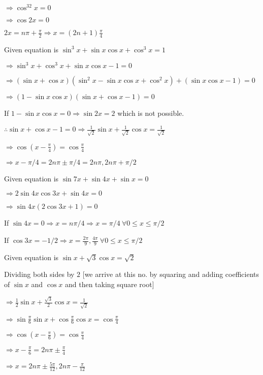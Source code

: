   $\Rightarrow \cos^32x = 0$

  $\Rightarrow \cos 2x = 0$

  $2x = n\pi + \frac{\pi}{2} \Rightarrow x = (2n + 1)\frac{\pi}{4}$

\item Given equation is $\sin^3x + \sin x\cos x + \cos^3x = 1$

  $\Rightarrow \sin^3x + \cos^3x + \sin x\cos x - 1 = 0$

  $\Rightarrow (\sin x + \cos x)(\sin^2x - \sin x\cos x + \cos^2x) + (\sin x\cos x - 1) = 0$

  $\Rightarrow (1 - \sin x\cos x)(\sin x + \cos x - 1) = 0$

  If $1 - \sin x\cos x = 0 \Rightarrow \sin 2x = 2$ which is not possible.

  $\therefore \sin x + \cos x - 1 = 0 \Rightarrow \frac{1}{\sqrt{2}}\sin x + \frac{1}{\sqrt{2}}\cos x = \frac{1}{\sqrt{2}}$

  $\Rightarrow \cos\left(x - \frac{\pi}{4}\right) = \cos\frac{\pi}{4}$

  $\Rightarrow x - \pi/4 = 2n\pi \pm \pi/4 = 2n\pi, 2n\pi + \pi/2$

\item Given equation is $\sin 7x + \sin4x + \sin x = 0$

  $\Rightarrow 2\sin4x\cos3x + \sin4x = 0$

  $\Rightarrow \sin4x(2\cos3x + 1) = 0$

  If $\sin4x = 0 \Rightarrow x = n\pi/4 \Rightarrow x = \pi/4~\forall 0\leq x\leq\pi/2$

  If $\cos3x = -1/2 \Rightarrow x = \frac{2\pi}{9}, \frac{4\pi}{9}~\forall 0\leq x\leq\pi/2$

\item Given equation is $\sin x + \sqrt{3}\cos x = \sqrt{2}$

  Dividing both sides by $2$ [we arrive at this no. by squaring and adding coefficients of $\sin x$ and $\cos x$
    and then taking square root]

  $\Rightarrow \frac{1}{2}\sin x + \frac{\sqrt{3}}{2}\cos x = \frac{1}{\sqrt{2}}$

  $\Rightarrow \sin\frac{\pi}{6}\sin x + \cos\frac{\pi}{6}\cos x = \cos\frac{\pi}{4}$

  $\Rightarrow \cos\left(x - \frac{\pi}{6}\right) = \cos\frac{\pi}{4}$

  $\Rightarrow x - \frac{\pi}{6} = 2n\pi\pm\frac{\pi}{4}$

  $\Rightarrow x = 2n\pi\pm\frac{5\pi}{12}, 2n\pi-\frac{\pi}{12}$

